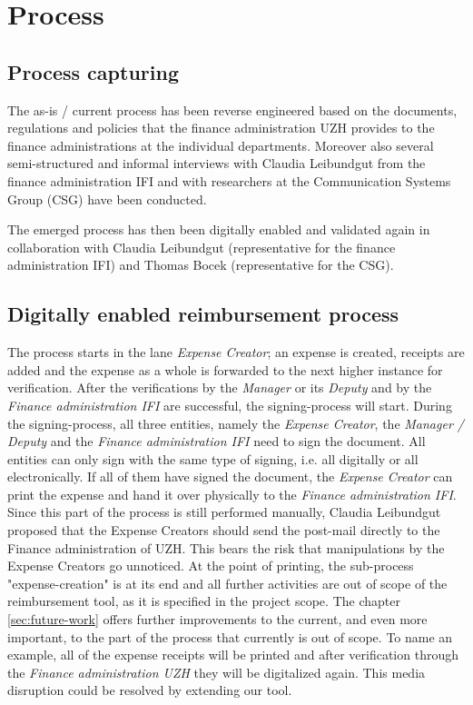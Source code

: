 \chapter{Process}

\section{Process capturing}
The as-is / current process has been reverse engineered based on the documents, regulations and policies that the finance administration UZH provides to the finance administrations at the individual departments. Moreover also several semi-structured and informal interviews with Claudia Leibundgut from the finance administration IFI and with researchers at the Communication Systems Group (CSG) have been conducted.\par
The emerged process has then been digitally enabled and validated again in collaboration with Claudia Leibundgut (representative for the finance administration IFI) and Thomas Bocek (representative for the CSG).

\section{Digitally enabled reimbursement process}
\label{sec:processflow}
The process starts in the lane \textit{Expense Creator}; an expense is created, receipts are added and the expense as a whole is forwarded to the next higher instance for verification. After the verifications by the \textit{Manager} or its \textit{Deputy} and by the \textit{Finance administration IFI} are successful, the signing-process will start.\newline
During the signing-process, all three entities, namely the \textit{Expense Creator}, the \textit{Manager / Deputy} and the \textit{Finance administration IFI} need to sign the document. All entities can only sign with the same type of signing, i.e. all digitally or all electronically. If all of them have signed the document, the \textit{Expense Creator} can print the expense and hand it over physically to the \textit{Finance administration IFI}.\newline
Since this part of the process is still performed manually, Claudia Leibundgut proposed that the Expense Creators should send the post-mail directly to the Finance administration of UZH. This bears the risk that manipulations by the Expense Creators go unnoticed.\newline
At the point of printing, the sub-process "expense-creation" is at its end and all further activities are out of scope of the reimbursement tool, as it is specified in the project scope. The chapter \ref{sec:future-work} offers further improvements to the current, and even more important, to the part of the process that currently is out of scope. To name an example, all of the expense receipts will be printed and after verification through the \textit{Finance administration UZH} they will be digitalized again. This media disruption could be resolved by extending our tool.\par


